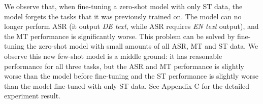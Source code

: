 \documentclass[conference]{IEEEtran}
\begin{document}
	
	We observe that, when fine-tuning a zero-shot model with only ST data, the model forgets the tasks that it was previously trained on. The model can no longer perform ASR (it output \textit{DE text}, while ASR requires \textit{EN text} output), and the MT performance is significantly worse. This problem can be solved by fine-tuning the zero-shot model with small amounts of all ASR, MT and ST data. We observe this new few-shot model is a middle ground: it has reasonable performance for all three tasks, but the ASR and MT performance is slightly worse than the model before fine-tuning and the ST performance is slightly worse than the model fine-tuned with only ST data. See Appendix C for the detailed experiment result.
	
\end{document}
